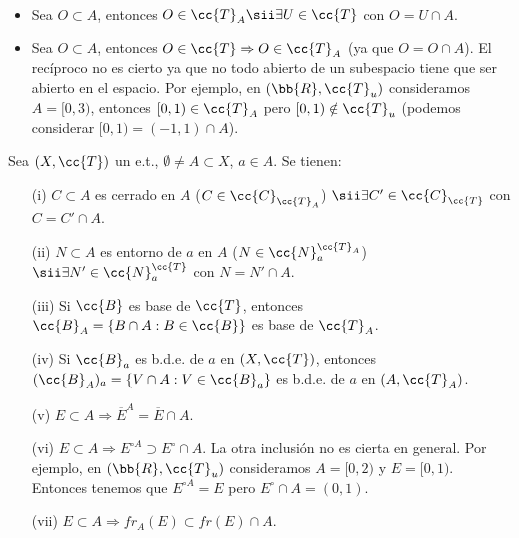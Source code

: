 \begin{observacion}\
    \begin{itemize}
        \item Sea $O\subset A$, entonces $O \in \cc{T}_A \sii \exists U \in \cc{T}$ con $O=U\cap A$.
        \item Sea $O \subset A$, entonces $O\in \cc{T} \Rightarrow O \in \cc{T}_A$ (ya que $O=O\cap A$). El recíproco no es cierto ya que no todo abierto de un subespacio tiene que ser abierto en el espacio. Por ejemplo, en $(\bb{R}, \cc{T}_u)$ consideramos $A=[0,3)$, entonces $[0,1)\in \cc{T}_A$ pero $[0,1)\notin \cc{T}_u$ (podemos considerar $[0,1) = (-1,1)\cap A$).
    \end{itemize}
    \endsquare
\end{observacion}

\begin{prop}
    Sea $(X, \cc{T})$ un e.t., $\emptyset \neq A \subset X$, $a\in A$. Se tienen:
    \begin{enumerate}
        \item[(i)] $C\subset A$ es cerrado en $A$ ($C\in \cc{C}_{\cc{T}_A}$) $\sii \exists C' \in \cc{C}_{\cc{T}}$ con $C=C'\cap A$.
        \item[(ii)]  $N\subset A$ es entorno de $a$ en $A$ ($N \in \cc{N}_a^{\cc{T}_A}$) $\sii \exists N' \in \cc{N}_a^{\cc{T}}$ con $N=N'\cap A$.
        \item[(iii)] Si $\cc{B}$ es base de $\cc{T}$, entonces $\cc{B}_A = \{B\cap A : B \in \cc{B}\}$ es base de $\cc{T}_A$.
        \item[(iv)] Si $\cc{B}_a$ es b.d.e. de $a$ en $(X, \cc{T})$, entonces $(\cc{B}_A)_a = \{V\cap A : V\in \cc{B}_a\}$ es b.d.e. de $a$ en $(A, \cc{T}_A)$.
        \item[(v)] $E\subset A \Rightarrow \overline{E}^A = \overline{E}\cap A$.
        \item[(vi)] $E\subset A \Rightarrow E^{\circ A} \supset E^\circ \cap A$. La otra inclusión no es cierta en general. Por ejemplo, en $(\bb{R}, \cc{T}_u)$ consideramos $A=[0,2)$ y $E=[0,1)$. Entonces tenemos que $E^{\circ A} = E$ pero $E^\circ \cap A = (0,1)$.
        \item[(vii)] $E\subset A \Rightarrow fr_A(E)\subset fr(E)\cap A$.  
    \end{enumerate}


\end{prop}

